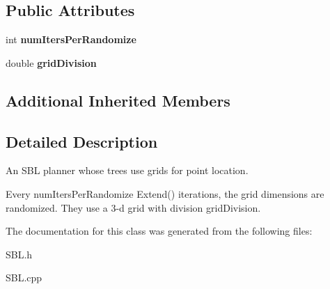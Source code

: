 \subsection*{Public Attributes}
\begin{DoxyCompactItemize}
\item 
int {\bfseries num\+Iters\+Per\+Randomize}\label{classSBLPlannerWithGrid_a224e9dc7e6f695172ea59dc4a3a040c0}

\item 
double {\bfseries grid\+Division}\label{classSBLPlannerWithGrid_a87e6c4778cde4b92f658bf4b091658d0}

\end{DoxyCompactItemize}
\subsection*{Additional Inherited Members}


\subsection{Detailed Description}
An S\+BL planner whose trees use grids for point location. 

Every num\+Iters\+Per\+Randomize Extend() iterations, the grid dimensions are randomized. They use a 3-\/d grid with division grid\+Division. 

The documentation for this class was generated from the following files\+:\begin{DoxyCompactItemize}
\item 
S\+B\+L.\+h\item 
S\+B\+L.\+cpp\end{DoxyCompactItemize}
